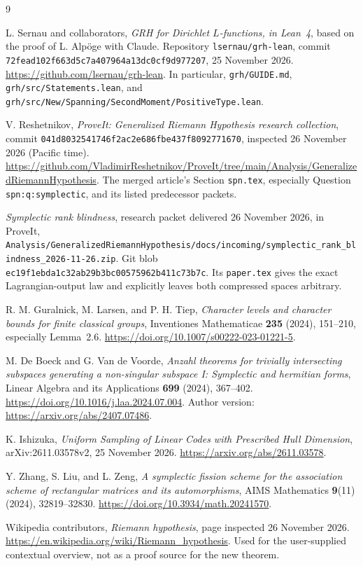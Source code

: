 \begin{thebibliography}{9}
\raggedright
{}
L. Sernau and collaborators, \emph{GRH for Dirichlet $L$-functions, in Lean~4}, based on the proof of L. Alp\"oge with Claude. Repository \texttt{lsernau/grh-lean}, commit \texttt{72fead102f663d5c7a407964a13dc0cf9d977207}, 25 November 2026. \url{https://github.com/lsernau/grh-lean}. In particular, \texttt{grh/GUIDE.md}, \texttt{grh/src/Statements.lean}, and \texttt{grh/src/New/Spanning/SecondMoment/PositiveType.lean}.

V. Reshetnikov, \emph{ProveIt: Generalized Riemann Hypothesis research collection}, commit \texttt{041d8032541746f2ac2e686fbe437f8092771670}, inspected 26 November 2026 (Pacific time). \url{https://github.com/VladimirReshetnikov/ProveIt/tree/main/Analysis/GeneralizedRiemannHypothesis}. The merged article's Section \texttt{spn.tex}, especially Question \texttt{spn:q:symplectic}, and its listed predecessor packets.

\emph{Symplectic rank blindness}, research packet delivered 26 November 2026, in ProveIt, \texttt{Analysis/GeneralizedRiemannHypothesis/docs/incoming/}\allowbreak\texttt{symplectic\_rank\_blindness\_2026-11-26.zip}. Git blob \texttt{ec19f1ebda1c32ab29b3bc00575962b411c73b7c}. Its \texttt{paper.tex} gives the exact Lagrangian-output law and explicitly leaves both compressed spaces arbitrary.

R. M. Guralnick, M. Larsen, and P. H. Tiep, \emph{Character levels and character bounds for finite classical groups}, Inventiones Mathematicae \textbf{235} (2024), 151--210, especially Lemma~2.6. \url{https://doi.org/10.1007/s00222-023-01221-5}.

M. De Boeck and G. Van de Voorde, \emph{Anzahl theorems for trivially intersecting subspaces generating a non-singular subspace I: Symplectic and hermitian forms}, Linear Algebra and its Applications \textbf{699} (2024), 367--402. \url{https://doi.org/10.1016/j.laa.2024.07.004}. Author version: \url{https://arxiv.org/abs/2407.07486}.

K. Ishizuka, \emph{Uniform Sampling of Linear Codes with Prescribed Hull Dimension}, arXiv:2611.03578v2, 25 November 2026. \url{https://arxiv.org/abs/2611.03578}.

Y. Zhang, S. Liu, and L. Zeng, \emph{A symplectic fission scheme for the association scheme of rectangular matrices and its automorphisms}, AIMS Mathematics \textbf{9}(11) (2024), 32819--32830. \url{https://doi.org/10.3934/math.20241570}.

Wikipedia contributors, \emph{Riemann hypothesis}, page inspected 26 November 2026. \url{https://en.wikipedia.org/wiki/Riemann_hypothesis}. Used for the user-supplied contextual overview, not as a proof source for the new theorem.
\end{thebibliography}

